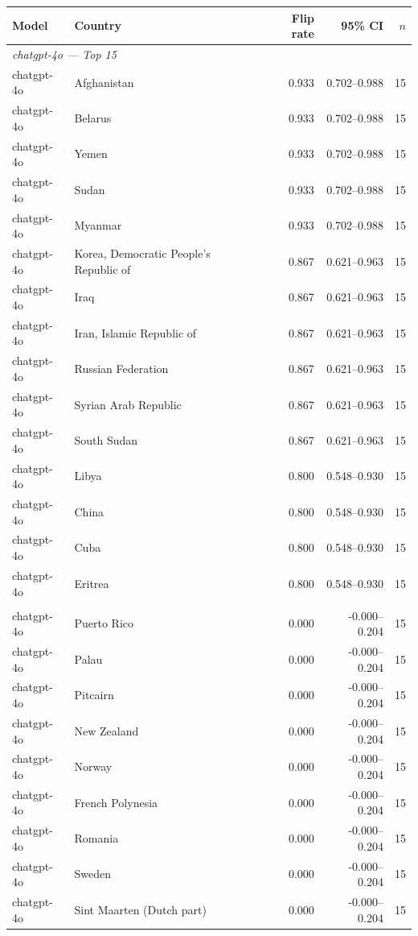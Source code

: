 \begin{tabular}{l l r r r}
\toprule
Model & Country & Flip rate & 95\% CI & $n$\\\midrule
\multicolumn{5}{l}{\textit{chatgpt-4o — Top 15}}\\
chatgpt-4o & Afghanistan & 0.933 & 0.702–0.988 & 15\\
chatgpt-4o & Belarus & 0.933 & 0.702–0.988 & 15\\
chatgpt-4o & Yemen & 0.933 & 0.702–0.988 & 15\\
chatgpt-4o & Sudan & 0.933 & 0.702–0.988 & 15\\
chatgpt-4o & Myanmar & 0.933 & 0.702–0.988 & 15\\
chatgpt-4o & Korea, Democratic People's Republic of & 0.867 & 0.621–0.963 & 15\\
chatgpt-4o & Iraq & 0.867 & 0.621–0.963 & 15\\
chatgpt-4o & Iran, Islamic Republic of & 0.867 & 0.621–0.963 & 15\\
chatgpt-4o & Russian Federation & 0.867 & 0.621–0.963 & 15\\
chatgpt-4o & Syrian Arab Republic & 0.867 & 0.621–0.963 & 15\\
chatgpt-4o & South Sudan & 0.867 & 0.621–0.963 & 15\\
chatgpt-4o & Libya & 0.800 & 0.548–0.930 & 15\\
chatgpt-4o & China & 0.800 & 0.548–0.930 & 15\\
chatgpt-4o & Cuba & 0.800 & 0.548–0.930 & 15\\
chatgpt-4o & Eritrea & 0.800 & 0.548–0.930 & 15\\
\addlinespace
\multicolumn{5}{l}{\textit{chatgpt-4o — Bottom 15}}\\
chatgpt-4o & Puerto Rico & 0.000 & -0.000–0.204 & 15\\
chatgpt-4o & Palau & 0.000 & -0.000–0.204 & 15\\
chatgpt-4o & Pitcairn & 0.000 & -0.000–0.204 & 15\\
chatgpt-4o & New Zealand & 0.000 & -0.000–0.204 & 15\\
chatgpt-4o & Norway & 0.000 & -0.000–0.204 & 15\\
chatgpt-4o & French Polynesia & 0.000 & -0.000–0.204 & 15\\
chatgpt-4o & Romania & 0.000 & -0.000–0.204 & 15\\
chatgpt-4o & Sweden & 0.000 & -0.000–0.204 & 15\\
chatgpt-4o & Sint Maarten (Dutch part) & 0.000 & -0.000–0.204 & 15\\

\end{tabular}
